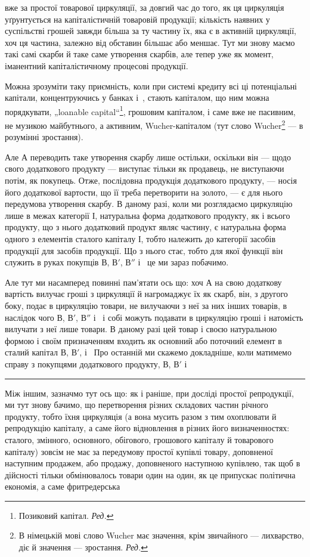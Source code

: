 \parcont{}  %
вже за простої товарової циркуляції, за довгий час до того, як ця циркуляція
уґрунтується на капіталістичній товаровій продукції; кількість
наявних у суспільстві грошей завжди більша за ту частину їх, яка є
в активній циркуляції, хоч ця частина, залежно від обставин більшає
або меншає. Тут ми знову маємо такі самі скарби й таке саме утворення
скарбів, але тепер уже як момент, іманентний капіталістичному процесові
продукції.

Можна зрозуміти таку приємність, коли при системі кредиту всі ці
потенціальні капітали, концентруючись у банках і~, стають капіталом,
що ним можна порядкувати, „loanable capital“\footnote*{
Позиковий капітал. \emph{Ред.}
}, грошовим капіталом,
і саме вже не пасивним, не музикою майбутнього, а активним,
Wucher-капіталом (тут слово Wucher\footnote*{
В німецькій мові слово Wucher має значення, крім звичайного — лихварство,
діє й значення — зростання. \emph{Ред.}
} — в розумінні зростання).

Але $А$ переводить таке утворення скарбу лише остільки, оскільки він —
щодо свого додаткового продукту — виступає тільки як продавець, не виступаючи
потім, як покупець. Отже, послідовна продукція додаткового
продукту, — носія його додаткової вартости, що її треба перетворити
на золото, — є для нього передумова утворення скарбу. В даному разі,
коли ми розглядаємо циркуляцію лише в межах категорії І, натуральна
форма додаткового продукту, як і всього продукту, що з нього додатковий
продукт являє частину, є натуральна форма одного з елементів
сталого капіталу І, тобто належить до категорії засобів продукції для
засобів продукції. Що з нього стає, тобто для якої функції він служить
в руках покупців $В$, $В'$, $В''$ і~ це ми зараз побачимо.

Але тут ми насамперед повинні пам’ятати ось що: хоч $А$ на свою
додаткову вартість вилучає гроші з циркуляції й нагромаджує їх як
скарб, він, з другого боку, подає в циркуляцію товари, не вилучаючи
з неї за них інших товарів, в наслідок чого $В$, $В'$,  $В''$ і~ і собі
можуть подавати в циркуляцію гроші і натомість вилучати з неї лише
товари. В даному разі цей товар і своєю натуральною формою і своїм
призначенням входить як основний або поточний елемент в сталий капітал
$В$, $В'$, і~ Про останній ми скажемо докладніше, коли матимемо
справу з покупцями додаткового продукту, $В$, $В'$ і~

\pfbreak

Між іншим, зазначмо тут ось що: як і раніше, при досліді простої
репродукції, ми тут знову бачимо, що перетворення різних складових
частин річного продукту, тобто їхня циркуляція (а вона мусить разом
з тим охоплювати й репродукцію капіталу, а саме його відновлення
в різних його визначенностях: сталого, змінного, основного, обігового,
грошового капіталу й товарового капіталу) зовсім не має за передумову
простої купівлі товару, доповненої наступним продажем, або продажу,
доповненого наступною купівлею, так щоб в дійсності тільки обмінювалось
товари один на один, як це припускає політична економія, а саме фритредерська
\parbreak{}  %
